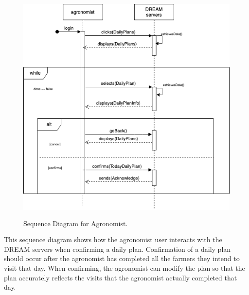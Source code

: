 \begin{figure}[hbt!]
\centering
\includegraphics[scale=0.6]{Files/sequence_disgrams/thePNGs/agronomist_confirmPlan.png}\\
\caption{\label{fig:agrSeqConfirmPlan}Sequence Diagram for Agronomist.}
\end{figure}

\begin{flushleft}
This sequence diagram shows how the agronomist user interacts with the DREAM servers when confirming a daily plan. Confirmation of a daily plan should occur after the agronomist has completed all the farmers they intend to visit that day. When confirming, the agronomist can modify the plan so that the plan accurately reflects the visits that the agronomist actually completed that day.
\end{flushleft}


